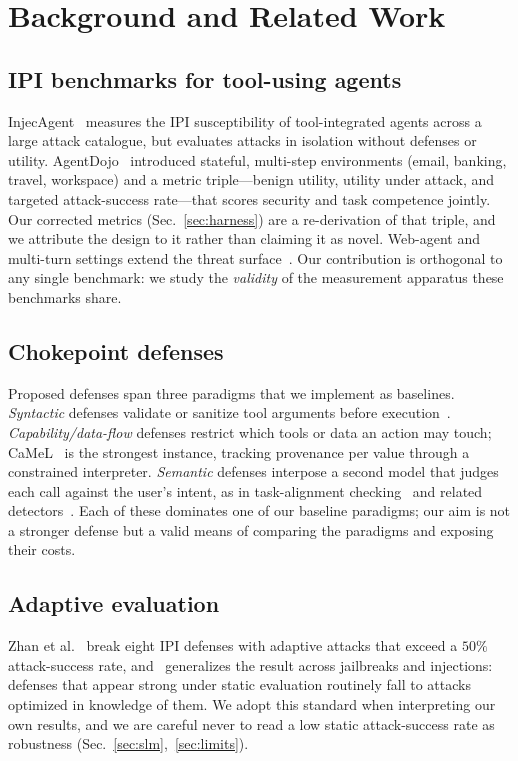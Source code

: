 \documentclass[conference]{IEEEtran}
\begin{document}
\section{Background and Related Work}
\label{sec:related}

\subsection{IPI benchmarks for tool-using agents}
InjecAgent~\cite{injecagent} measures the IPI susceptibility of tool-integrated
agents across a large attack catalogue, but evaluates attacks in isolation without
defenses or utility. AgentDojo~\cite{agentdojo} introduced stateful, multi-step
environments (email, banking, travel, workspace) and a metric triple---benign
utility, utility under attack, and targeted attack-success rate---that scores
security and task competence jointly. Our corrected metrics (Sec.~\ref{sec:harness})
are a re-derivation of that triple, and we attribute the design to it rather than
claiming it as novel. Web-agent and multi-turn settings extend the
threat surface~\cite{wasp,toolshield}. Our contribution is orthogonal to any single
benchmark: we study the \emph{validity} of the measurement apparatus these
benchmarks share.

\subsection{Chokepoint defenses}
Proposed defenses span three paradigms that we implement as baselines.
\emph{Syntactic} defenses validate or sanitize tool arguments before
execution~\cite{commandsans}. \emph{Capability/data-flow} defenses restrict which
tools or data an action may touch; CaMeL~\cite{camel} is the strongest instance,
tracking provenance per value through a constrained interpreter. \emph{Semantic}
defenses interpose a second model that judges each call against the user's intent,
as in task-alignment checking~\cite{taskshield} and related
detectors~\cite{ipiguard,melon}. Each of these dominates one of our baseline
paradigms; our aim is not a stronger defense but a valid means of comparing the
paradigms and exposing their costs.

\subsection{Adaptive evaluation}
Zhan et al.~\cite{adaptive} break eight IPI defenses with adaptive attacks that
exceed a $50\%$ attack-success rate, and~\cite{attacker-second} generalizes the
result across jailbreaks and injections: defenses that appear strong under static
evaluation routinely fall to attacks optimized in knowledge of them. We adopt this
standard when interpreting our own results, and we are careful never to read a low
static attack-success rate as robustness (Sec.~\ref{sec:slm},~\ref{sec:limits}).
\end{document}
